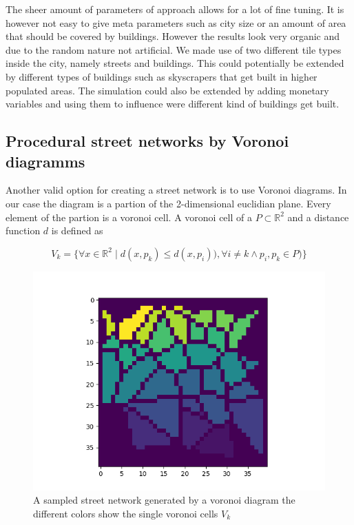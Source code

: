 \documentclass{scrartcl}
\begin{document}
The sheer amount of parameters of approach allows for a lot of fine tuning.
It is however not easy to give meta parameters such as city size or an amount
of area that should be covered by buildings. However the results look very organic
and due to the random nature not artificial. We made use of two different tile types
inside the city, namely streets and buildings. This could potentially be extended
by different types of buildings such as skyscrapers that get built in higher
populated areas. The simulation could also be extended by adding monetary variables
and using them to influence were different kind of buildings get built.

\subsection{Procedural street networks by Voronoi diagramms}

Another valid option for creating a street network is to use Voronoi diagrams.
In our case the diagram is a partion of the 2-dimensional euclidian plane.
Every element of the partion is a voronoi cell.
A voronoi cell of a  $ P \subset \mathbb{R}^2 $ and a distance function $d$ is defined as

\[
    V_k=\lbrace \forall x \in \mathbb{R}^2 \mid d(x,p_k) \leq d(x,p_i)), \forall i \ne k \land p_i,p_k \in P ) \rbrace
\]

\begin{figure}
    \centering
    \includegraphics[scale = 0.5]{voro}
    \caption{A sampled street network generated by a voronoi diagram
    the different colors show the single voronoi cells $V_k$}
    \label{fig:voronoi}
\end{figure}
\end{document}
